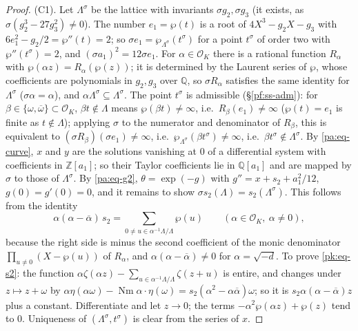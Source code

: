 \documentclass[10pt]{amsart}
\theoremstyle{definition}
\theoremstyle{remark}
\newcommand{\Z}{\mathbb Z}
\newcommand{\Q}{\mathbb Q}
\providecommand{\auNm}{\operatorname{Nm}}
\providecommand{\auO}{\mathcal O}
\providecommand{\aubar}[1]{\overline{#1}}
\begin{document}
\begin{proof}
(C1). Let $\Lambda^\sigma$ be the lattice with invariants $\sigma g_2,\sigma g_3$ (it exists, as
$\sigma(g_2^3-27g_3^2)\ne0$). The number $e_1=\wp(t)$ is a root of $4X^3-g_2X-g_3$ with
$6e_1^2-g_2/2=\wp''(t)=2$; so $\sigma e_1=\wp_{\Lambda^\sigma}(t^\sigma)$ for a point $t^\sigma$ of
order two with $\wp''(t^\sigma)=2$, and $(\sigma a_1)^2=12\sigma e_1$. For $\alpha\in\auO_K$ there
is a rational function $R_\alpha$ with $\wp(\alpha z)=R_\alpha(\wp(z))$; it is determined by the
Laurent series of $\wp$, whose coefficients are polynomials in $g_2,g_3$ over $\Q$, so
$\sigma R_\alpha$ satisfies the same identity for $\Lambda^\sigma$ ($\sigma\alpha=\alpha$), and
$\alpha\Lambda^\sigma\subseteq\Lambda^\sigma$. The point $t^\sigma$ is admissible
(\S\ref{pf:ss-adm}): for $\beta\in\{\omega,\aubar\omega\}\subset\auO_K$, $\beta t\notin\Lambda$
means $\wp(\beta t)\ne\infty$, i.e.\ $R_\beta(e_1)\ne\infty$ ($\wp(t)=e_1$ is finite as $t\notin\Lambda$);
applying $\sigma$ to the numerator and denominator of $R_\beta$, this is equivalent to
$(\sigma R_\beta)(\sigma e_1)\ne\infty$, i.e.\ $\wp_{\Lambda^\sigma}(\beta t^\sigma)\ne\infty$, i.e.\
$\beta t^\sigma\notin\Lambda^\sigma$. By \eqref{pa:eq-curve}, $x$ and $y$ are the solutions
vanishing at $0$ of a differential system with coefficients in $\Z[a_1]$; so their Taylor
coefficients lie in $\Q[a_1]$ and are mapped by $\sigma$ to those of $\Lambda^\sigma$. By
\eqref{pa:eq-g2}, $\theta=\exp(-g)$ with $g''=x+s_2+a_1^2/12$, $g(0)=g'(0)=0$, and it remains to
show $\sigma s_2(\Lambda)=s_2(\Lambda^\sigma)$. This follows from the identity
\begin{equation}\label{pk:eq-s2}
\alpha(\alpha-\aubar\alpha)\,s_2=\sum_{0\ne u\in\alpha^{-1}\Lambda/\Lambda}\wp(u)\qquad(\alpha\in
\auO_K,\ \alpha\ne0),
\end{equation}
because the right side is minus the second coefficient of the monic denominator
$\prod_{u\ne0}(X-\wp(u))$ of $R_\alpha$, and $\alpha(\alpha-\aubar\alpha)\ne0$ for
$\alpha=\sqrt{-d}$. To prove \eqref{pk:eq-s2}: the function $\alpha\zeta(\alpha z)-\sum_{u\in
\alpha^{-1}\Lambda/\Lambda}\zeta(z+u)$ is entire, and changes under $z\mapsto z+\omega$ by
$\alpha\eta(\alpha\omega)-\auNm\alpha\cdot\eta(\omega)=s_2(\alpha^2-\alpha\aubar\alpha)\omega$; so
it is $s_2\alpha(\alpha-\aubar\alpha)z$ plus a constant. Differentiate and let $z\to0$; the terms
$-\alpha^2\wp(\alpha z)+\wp(z)$ tend to $0$. Uniqueness of $(\Lambda^\sigma,t^\sigma)$ is clear
from the series of $x$.


\end{proof}
\end{document}
